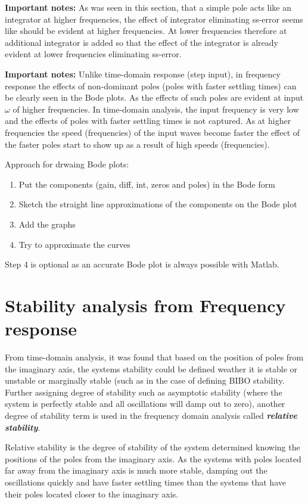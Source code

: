 \textbf{Important notes: }As was seen in this section, that a simple pole acts like an integrator at higher frequencies, the effect of integrator eliminating ss-error seems like should be evident at higher frequencies. At lower frequencies therefore at additional integrator is added so that the effect of the integrator is already evident at lower frequencies eliminating ss-error.

\textbf{Important notes: }Unlike time-domain response (step input), in frequency response the effects of non-dominant poles (poles with faster settling times) can be clearly seen in the Bode plots. As the effects of such poles are evident at input $\omega$ of higher frequencies. In time-domain analysis, the input frequency is very low and the effects of poles with faster settling times is not captured. As at higher frequencies the speed (frequencies) of the input waves become faster the effect of the faster poles start to show up as a result of high speeds (frequencies).

Approach for drwaing Bode plots:
\begin{enumerate}
	\item Put the components (gain, diff, int, zeros and poles) in the Bode form
	\item Sketch the straight line approximations of the components on the Bode plot
	\item Add the graphs
	\item Try to approximate the curves
\end{enumerate}
Step 4 is optional as an accurate Bode plot is always possible with Matlab.

\section{Stability analysis from Frequency response}

From time-domain analysis, it was found that based on the position of poles from the imaginary axis, the systems stability could be defined weather it is stable or unstable or marginally stable (such as in the case of defining BIBO stability. Further assigning degree of stability such as asymptotic stability (where the system is perfectly stable and all oscillations will damp out to zero), another degree of stability term is used in the frequency domain analysis called \textbf{\textit{relative stability}}.

Relative stability is the degree of stability of the system determined knowing the positions of the poles from the imaginary axis. As the systems with poles located far away from the imaginary axis is much more stable, damping out the oscillations quickly and have faster settling times than the systems that have their poles located closer to the imaginary axis.

